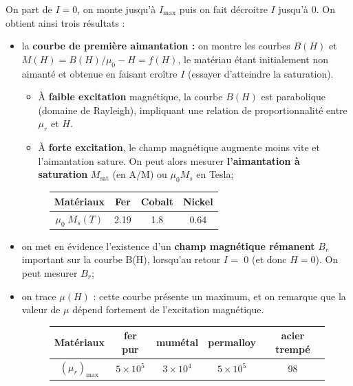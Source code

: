 \documentclass[11pt,a4paper]{report}
\begin{document}
On part de $I = 0$, on monte jusqu'à $I_\text{max}$ puis on fait décroitre $I$ jusqu'à 0. On obtient ainsi trois résultats :
\begin{itemize}
	\item la \textbf{courbe de première aimantation :} on montre les courbes $B(H)$ 
	et $M(H) = B(H)/\mu_0 - H = f(H)$, le matériau étant initialement non aimanté et obtenue en faisant 	croître $I$ (essayer d'atteindre la saturation). 
	
	\begin{itemize}
		\item \`A \textbf{faible excitation} magnétique, la courbe $B(H)$ est parabolique 
		(domaine de Rayleigh), impliquant une relation de proportionnalité entre $\mu_r$ et $H$.
		\item \`A \textbf{forte excitation}, le champ magnétique augmente moins vite et l'aimantation 			sature. On peut alors mesurer \textbf{l'aimantation à saturation} $M_\text{sat}$ 
		(en A/M) ou $\mu_0 M_s$ en Tesla;
	\end{itemize}
	
	\begin{figure}[h!]
	\begin{center}
		\begin{tabular}{|c|c|c|c|}
		\hline
		Matériaux & Fer & Cobalt & Nickel \\
		\hline
		$\mu_0\;M_s(T)$ & 2.19 & 1.8 & 0.64 \\
		\hline
		\end{tabular}	
	\end{center}
	\end{figure}
	
	\item on met en évidence l'existence d'un \textbf{champ magnétique rémanent} $B_r$ important sur la 	courbe B(H), lorsqu'au retour $I =$ 0 (et donc $H = 0$). On peut mesurer $B_r$;
	
	\item on trace $\mu(H)$ : cette courbe présente un maximum, et on remarque que la valeur de $\mu$ 		dépend fortement de l'excitation magnétique.
	\begin{figure}[h!]
	\begin{center}
		\begin{tabular}{|c|c|c|c|c|}
		\hline
		Matériaux & fer pur & mumétal & permalloy & acier trempé \\
		\hline
		$(\mu_r)_\text{max}$ & $5\times10^{5}$ & $3\times10^{4}$ & $5\times10^{5}$ & 98\\
		\hline
		\end{tabular}	
	\end{center}
	\end{figure}
\end{itemize}
\end{document}
